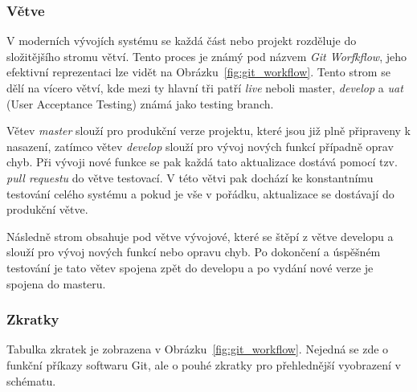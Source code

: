 \subsubsection*{Větve}
\label{subsubsec:implementation-collaboration-versioning-branches}
V moderních vývojích systému se každá část nebo projekt rozděluje do složitějšího stromu větví. Tento proces je známý pod názvem \textit{Git Worfkflow}, jeho efektivní reprezentaci lze vidět na Obrázku~\ref{fig:git_workflow}. Tento strom se dělí na vícero větví, kde mezi ty hlavní tři patří \textit{live} neboli master, \textit{develop} a \textit{uat} (User Acceptance Testing) známá jako testing branch.

Větev \textit{master} slouží pro produkční verze projektu, které jsou již plně připraveny k nasazení, zatímco větev \textit{develop} slouží pro vývoj nových funkcí případně oprav chyb. Při vývoji nové funkce se pak každá tato aktualizace dostává pomocí tzv. \textit{pull requestu} do větve testovací. V této větvi pak dochází ke konstantnímu testování celého systému a pokud je vše v pořádku, aktualizace se dostávají do produkční větve.

Následně strom obsahuje pod větve vývojové, které se štěpí z větve developu a slouží pro vývoj nových funkcí nebo opravu chyb. Po dokončení a úspěšném testování je tato větev spojena zpět do developu a po vydání nové verze je spojena do masteru.

\subsubsection*{Zkratky}
Tabulka zkratek je zobrazena v Obrázku~\ref{fig:git_workflow}. Nejedná se zde o funkční příkazy softwaru Git, ale o pouhé zkratky pro přehlednější vyobrazení v schématu.


